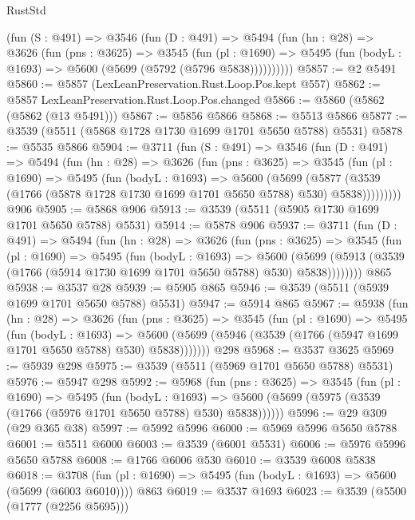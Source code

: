 \begin{lexlean}{RustStd}
\begin{coremodule}
      (fun (S : @491) =>
      @3546
        (fun (D : @491) =>
        @5494
          (fun (hn : @28) =>
          @3626
            (fun (pns : @3625) =>
            @3545
              (fun (pl : @1690) =>
              @5495 (fun (bodyL : @1693) => @5600 (@5699 (@5792 (@5796 @5838))))))))))
@5857 := @2 @5491
@5860 := @5857 (LexLeanPreservation.Rust.Loop.Pos.kept @557)
@5862 := @5857 LexLeanPreservation.Rust.Loop.Pos.changed
@5866 := @5860 (@5862 (@5862 (@13 @5491)))
@5867 := @5856 @5866
@5868 := @5513 @5866
@5877 := @3539 (@5511 (@5868 @1728 @1730 @1699 @1701 @5650 @5788) @5531)
@5878 := @5535 @5866
@5904 := @3711
    (fun (S : @491) =>
    @3546
      (fun (D : @491) =>
      @5494
        (fun (hn : @28) =>
        @3626
          (fun (pns : @3625) =>
          @3545
            (fun (pl : @1690) =>
            @5495
              (fun (bodyL : @1693) =>
              @5600
                (@5699
                  (@5877
                    (@3539 (@1766 (@5878 @1728 @1730 @1699 @1701 @5650 @5788) @530) @5838)))))))))
    @906
@5905 := @5868 @906
@5913 := @3539 (@5511 (@5905 @1730 @1699 @1701 @5650 @5788) @5531)
@5914 := @5878 @906
@5937 := @3711
    (fun (D : @491) =>
    @5494
      (fun (hn : @28) =>
      @3626
        (fun (pns : @3625) =>
        @3545
          (fun (pl : @1690) =>
          @5495
            (fun (bodyL : @1693) =>
            @5600
              (@5699 (@5913 (@3539 (@1766 (@5914 @1730 @1699 @1701 @5650 @5788) @530) @5838))))))))
    @865
@5938 := @3537 @28
@5939 := @5905 @865
@5946 := @3539 (@5511 (@5939 @1699 @1701 @5650 @5788) @5531)
@5947 := @5914 @865
@5967 := @5938
    (fun (hn : @28) =>
    @3626
      (fun (pns : @3625) =>
      @3545
        (fun (pl : @1690) =>
        @5495
          (fun (bodyL : @1693) =>
          @5600 (@5699 (@5946 (@3539 (@1766 (@5947 @1699 @1701 @5650 @5788) @530) @5838)))))))
    @298
@5968 := @3537 @3625
@5969 := @5939 @298
@5975 := @3539 (@5511 (@5969 @1701 @5650 @5788) @5531)
@5976 := @5947 @298
@5992 := @5968
    (fun (pns : @3625) =>
    @3545
      (fun (pl : @1690) =>
      @5495
        (fun (bodyL : @1693) =>
        @5600 (@5699 (@5975 (@3539 (@1766 (@5976 @1701 @5650 @5788) @530) @5838))))))
@5996 := @29 @309 (@29 @365 @38)
@5997 := @5992 @5996
@6000 := @5969 @5996 @5650 @5788
@6001 := @5511 @6000
@6003 := @3539 (@6001 @5531)
@6006 := @5976 @5996 @5650 @5788
@6008 := @1766 @6006 @530
@6010 := @3539 @6008 @5838
@6018 := @3708 (fun (pl : @1690) => @5495 (fun (bodyL : @1693) => @5600 (@5699 (@6003 @6010)))) @863
@6019 := @3537 @1693
@6023 := @3539 (@5500 (@1777 (@2256 @5695)))

\end{coremodule}
\end{lexlean}

